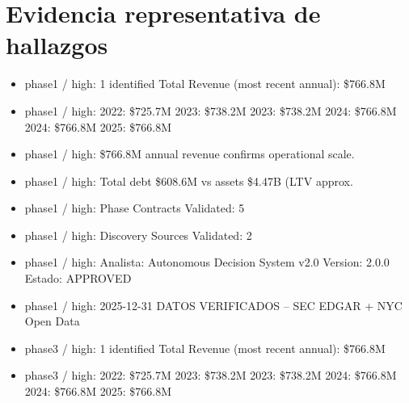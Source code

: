 \documentclass[11pt]{article}
\begin{document}
\section*{Evidencia representativa de hallazgos}
\begin{itemize}
\item phase1 / high: 1 identified Total Revenue (most recent annual): \$766.8M
\item phase1 / high: 2022: \$725.7M 2023: \$738.2M 2023: \$738.2M 2024: \$766.8M 2024: \$766.8M 2025: \$766.8M
\item phase1 / high: \$766.8M annual revenue confirms operational scale.
\item phase1 / high: Total debt \$608.6M vs assets \$4.47B (LTV approx.
\item phase1 / high: Phase Contracts Validated: 5
\item phase1 / high: Discovery Sources Validated: 2
\item phase1 / high: Analista: Autonomous Decision System v2.0 Version: 2.0.0   Estado: APPROVED
\item phase1 / high: 2025-12-31 DATOS VERIFICADOS -- SEC EDGAR + NYC Open Data
\item phase3 / high: 1 identified Total Revenue (most recent annual): \$766.8M
\item phase3 / high: 2022: \$725.7M 2023: \$738.2M 2023: \$738.2M 2024: \$766.8M 2024: \$766.8M 2025: \$766.8M
\end{itemize}
\end{document}
